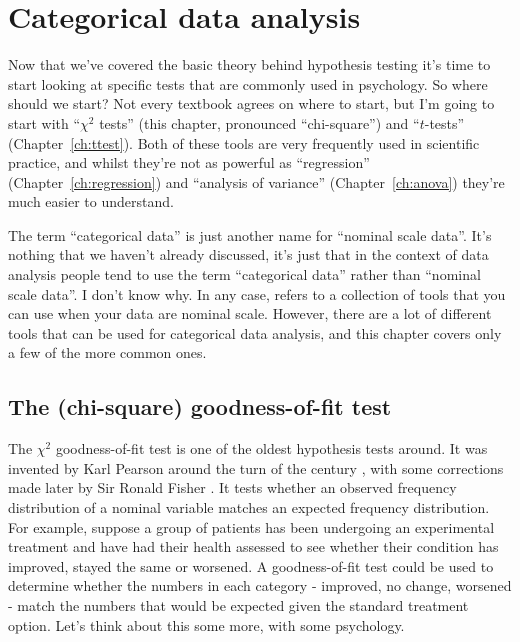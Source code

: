 
\chapter{Categorical data analysis\label{ch:chisquare}}

Now that we've covered the basic theory behind hypothesis testing it's time to start looking at specific tests that are commonly used in psychology. So where should we start? Not every textbook agrees on where to start, but I'm going to start with ``$\chi^2$ tests'' (this chapter, pronounced ``chi-square'') and ``$t$-tests'' (Chapter~\ref{ch:ttest}). Both of these tools are very frequently used in scientific practice, and whilst they're not as powerful as ``regression'' (Chapter~\ref{ch:regression}) and ``analysis of variance'' (Chapter~\ref{ch:anova}) they're much easier to understand.

The term ``categorical data'' is just another name for ``nominal scale data''. It's nothing that we haven't already discussed, it's just that in the context of data analysis people tend to use the term ``categorical data'' rather than ``nominal scale data''. I don't know why. In any case,  refers to a collection of tools that you can use when your data are nominal scale. However, there are a lot of different tools that can be used for categorical data analysis, and this chapter covers only a few of the more common ones.


\section{The \texorpdfstring{}{} (chi-square) goodness-of-fit test~\label{sec:goftest}}

The $\chi^2$ goodness-of-fit test is one of the oldest hypothesis tests around. It was invented by Karl Pearson around the turn of the century \parencite{Pearson1900}, with some corrections made later by  Sir Ronald Fisher \parencite{Fisher1922}. It tests whether an observed frequency distribution of a nominal variable matches an expected frequency distribution. For example, suppose a group of patients has been undergoing an experimental treatment and have had their health assessed to see whether their condition has improved, stayed the same or worsened. A goodness-of-fit test could be used to determine whether the numbers in each category - improved, no change, worsened - match the numbers that would be expected given the standard treatment option. Let's think about this some more, with some psychology. 

